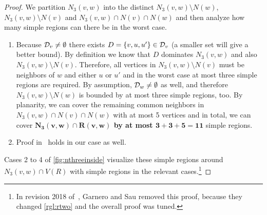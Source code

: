 \begin{proof}
        We partition $N_3(v,w)$ into the distinct $N_3(v,w) \setminus N(w)$, $N_3(v,w) \setminus N(v)$ and $N_3(v,w) \cap N(v) \cap N(w)$ and then analyze how many simple regions can there be in the worst case.

    \begin{enumerate}
        \item Because $\mathcal{D}_{v} \neq \emptyset$ there exists $D = \{v,u,u'\} \in \mathcal{D}_{v}$ (a smaller set will give a better bound). By definition we know that $D$ dominates $N_3(v,w)$ and also $N_3(v,w) \setminus N(v)$. Therefore, all vertices in $N_3(v,w) \setminus N(v)$ must be neighbors of $w$ and either $u$ or $u'$ and in the worst case at most three simple regions are required. By assumption, $\mathcal{D}_{w} \neq \emptyset$ as well, and therefore $N_3(v,w) \setminus N(w)$ is bounded by at most three simple regions, too.
        By planarity, we can cover the remaining common neighbors in $N_3(v,w) \cap N(v) \cap N(w)$ with at most 5 vertices and in total, we can cover \textbf{$\mathbf{N_3(v,w) \cap R(v,w)}$ by at most $\mathbf{3 + 3 +5 = 11}$} simple regions.

        \item Proof in~\cite{Garnero2018} holds in our case as well.

    
    \end{enumerate}

    Cases 2 to 4 of \cref{fig:nthreeinside} visualize these simple regions around $N_3(v,w) \cap V(R)$ with simple regions in the relevant cases.\footnote{In revision 2018 of~\cite{Garnero2018}, Garnero and Sau removed this proof, because they changed \cref{rgl:rtwo} and the overall proof was tuned.}
    
\end{proof}


